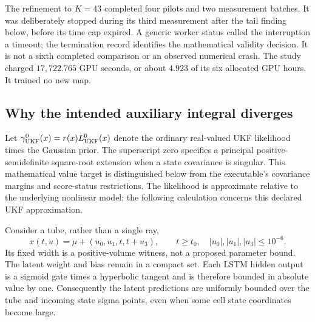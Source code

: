 The refinement to $K=43$ completed four pilots and two measurement batches.
It was deliberately stopped during its third measurement after the tail
finding below, before its time cap expired. A generic worker status called
the interruption a timeout; the termination record identifies the mathematical
validity decision. It is not a sixth completed comparison or an observed
numerical crash. The study charged $17{,}722.765$ GPU seconds, or about
$4.923$ of its six allocated GPU hours. It trained no new map.

\subsection{Why the intended auxiliary integral diverges}

Let $\gamma^0_{\rm UKF}(x)=r(x)L^0_{\rm UKF}(x)$ denote the ordinary
real-valued UKF likelihood times the Gaussian prior. The superscript zero
specifies a principal positive-semidefinite square-root extension when a
state covariance is singular. This mathematical value target is distinguished
below from the executable's covariance margins and score-status restrictions.
The likelihood is approximate relative to the underlying nonlinear model;
the following calculation concerns this declared UKF approximation.

Consider a tube, rather than a single ray,
\begin{equation}
 x(t,u)=\mu+(u_0,u_1,t,t+u_3),\qquad
 t\ge t_0,\quad |u_0|,|u_1|,|u_3|\le10^{-6}.
 \label{eq:bf-fab-tail-tube}
\end{equation}
Its fixed width is a positive-volume witness, not a proposed parameter bound.
The latent weight and bias remain in a compact set. Each LSTM hidden output
is a sigmoid gate times a hyperbolic tangent and is therefore bounded in
absolute value by one. Consequently the latent predictions are uniformly
bounded over the tube and incoming state sigma points, even when some cell
state coordinates become large.

